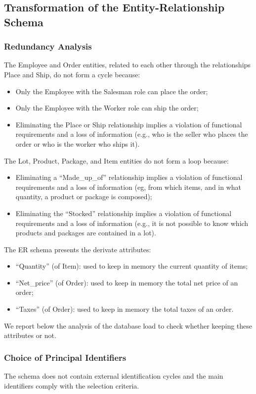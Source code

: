 \subsection{Transformation of the Entity-Relationship Schema}
\subsubsection{Redundancy Analysis}
The Employee and Order entities, related to each other through the relationships Place and Ship, do not form a cycle because:
\begin{itemize}
        \item Only the Employee with the Salesman role can place the order;
        \item Only the Employee with the Worker role can ship the order;
        \item Eliminating the Place or Ship relationship implies a violation of functional requirements and a loss of information (e.g., who is the seller who places the order or who is the worker who ships it).
\end{itemize}
The Lot, Product, Package, and Item entities do not form a loop because:
\begin{itemize}
        \item Eliminating a ``Made\_up\_of'' relationship implies a violation of functional requirements and a loss of information (eg, from which items, and in what quantity, a product or package is composed);
        \item Eliminating the ``Stocked'' relationship implies a violation of functional requirements and a loss of information (e.g., it is not possible to know which products and packages are contained in a lot).
\end{itemize}
The ER schema presents the derivate attributes:
\begin{itemize}
        \item ``Quantity'' (of Item): used to keep in memory the current quantity of items;
        \item ``Net\_price'' (of Order): used to keep in memory the total net price of an order;
        \item ``Taxes'' (of Order): used to keep in memory the total taxes of an order.
\end{itemize}
\vspace{0.25em}
We report below the analysis of the database load to check whether keeping these attributes or not.
\subsubsection{Choice of Principal Identifiers}
The schema does not contain external identification cycles and the main identifiers comply with the selection criteria.